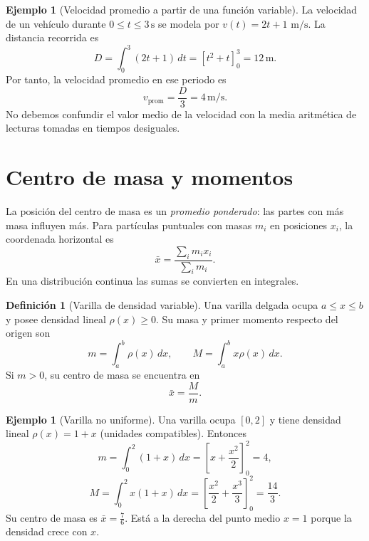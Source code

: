 \documentclass[12pt]{article}
\theoremstyle{definition}
\newtheorem{definicion}[teorema]{Definición}
\newtheorem{ejemplo}[teorema]{Ejemplo}
\theoremstyle{remark}
\newcommand{\dd}{\,dx}
\begin{document}
\begin{ejemplo}[Velocidad promedio a partir de una función variable]
La velocidad de un vehículo durante $0\le t\le3\,\mathrm s$ se modela por $v(t)=2t+1$ $\mathrm{m/s}$. La distancia recorrida es
\[
D=\int_0^3(2t+1)\,dt=[t^2+t]_0^3=12\,\mathrm m.
\]
Por tanto, la velocidad promedio en ese periodo es
\[
v_{\mathrm{prom}}=\frac D3=\boxed{4\,\mathrm{m/s}}.
\]
No debemos confundir el valor medio de la velocidad con la media aritmética de lecturas tomadas en tiempos desiguales.
\end{ejemplo}



\section{Centro de masa y momentos}
La posición del centro de masa es un \emph{promedio ponderado}: las partes con más masa influyen más. Para partículas puntuales con masas $m_i$ en posiciones $x_i$, la coordenada horizontal es
\[\bar x=\frac{\sum_i m_i x_i}{\sum_i m_i}.\]
En una distribución continua las sumas se convierten en integrales.
\begin{definicion}[Varilla de densidad variable]
Una varilla delgada ocupa $a\le x\le b$ y posee densidad lineal $\rho(x)\ge0$. Su masa y primer momento respecto del origen son
\[m=\int_a^b\rho(x)\dd,\qquad M=\int_a^b x\rho(x)\dd.\]
Si $m>0$, su centro de masa se encuentra en
\[\boxed{\bar x=\frac{M}{m}.}\]
\end{definicion}
\begin{ejemplo}[Varilla no uniforme]
Una varilla ocupa $[0,2]$ y tiene densidad lineal $\rho(x)=1+x$ (unidades compatibles). Entonces
\[m=\int_0^2(1+x)\dd=\left[x+\frac{x^2}{2}\right]_0^2=4,\]
\[M=\int_0^2x(1+x)\dd
=\left[\frac{x^2}{2}+\frac{x^3}{3}\right]_0^2=\frac{14}{3}.\]
Su centro de masa es $\boxed{\bar x=\frac76}$. Está a la derecha del punto medio $x=1$ porque la densidad crece con $x$.
\end{ejemplo}
\end{document}

